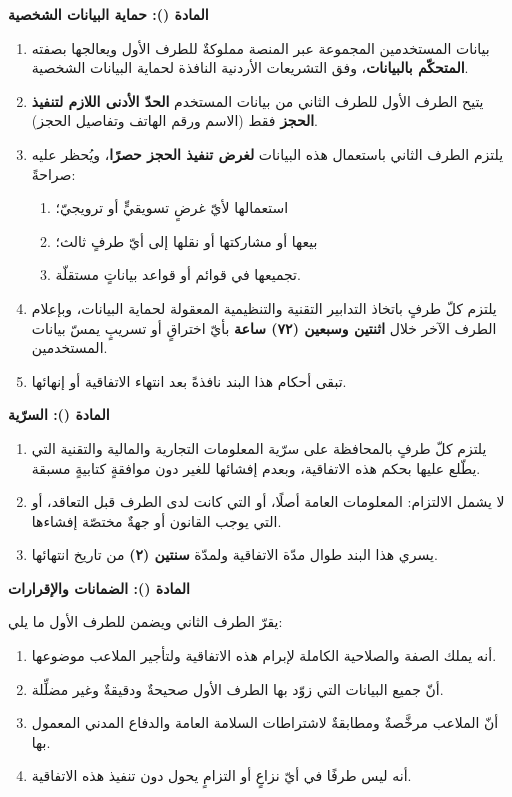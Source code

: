 \documentclass[12pt,a4paper]{article}
\newcounter{bndc}
\newcommand{\bnd}[1]{%
  \vspace{10pt}\par\noindent
  {\color{teal}\bfseries\large المادة (\arabic{bndc}): #1}%
  \stepcounter{bndc}%
  \par\vspace{2pt}\noindent{\color{rule}\rule{\linewidth}{0.6pt}}\par\vspace{4pt}%
}
\newcommand{\mlh}[1]{{\bfseries #1}}
\newenvironment{bnditems}
  {\begin{enumerate}[label=\arabic{bndc}.\arabic*,leftmargin=1.6em,itemsep=3pt,topsep=3pt]}
  {\end{enumerate}}
\newenvironment{sublist}
  {\begin{enumerate}[label=(\alph*),leftmargin=1.6em,itemsep=2pt,topsep=2pt]}
  {\end{enumerate}}
\begin{document}
\bnd{حماية البيانات الشخصية}\label{art:data}
\begin{bnditems}
  \item بيانات المستخدمين المجموعة عبر المنصة مملوكةٌ للطرف الأول ويعالجها بصفته \mlh{المتحكّم بالبيانات}، وفق التشريعات الأردنية النافذة لحماية البيانات الشخصية.
  \item يتيح الطرف الأول للطرف الثاني من بيانات المستخدم \mlh{الحدّ الأدنى اللازم لتنفيذ الحجز} فقط (الاسم ورقم الهاتف وتفاصيل الحجز).
  \item يلتزم الطرف الثاني باستعمال هذه البيانات \mlh{لغرض تنفيذ الحجز حصرًا}، ويُحظر عليه صراحةً:
  \begin{sublist}
    \item استعمالها لأيّ غرضٍ تسويقيٍّ أو ترويجيّ؛
    \item بيعها أو مشاركتها أو نقلها إلى أيّ طرفٍ ثالث؛
    \item تجميعها في قوائم أو قواعد بياناتٍ مستقلّة.
  \end{sublist}
  \item يلتزم كلّ طرفٍ باتخاذ التدابير التقنية والتنظيمية المعقولة لحماية البيانات، وبإعلام الطرف الآخر خلال \mlh{اثنتين وسبعين (٧٢) ساعة} بأيّ اختراقٍ أو تسريبٍ يمسّ بيانات المستخدمين.
  \item تبقى أحكام هذا البند نافذةً بعد انتهاء الاتفاقية أو إنهائها.
\end{bnditems}

\bnd{السرّية}\label{art:conf}
\begin{bnditems}
  \item يلتزم كلّ طرفٍ بالمحافظة على سرّية المعلومات التجارية والمالية والتقنية التي يطّلع عليها بحكم هذه الاتفاقية، وبعدم إفشائها للغير دون موافقةٍ كتابيةٍ مسبقة.
  \item لا يشمل الالتزام: المعلومات العامة أصلًا، أو التي كانت لدى الطرف قبل التعاقد، أو التي يوجب القانون أو جهةٌ مختصّة إفشاءها.
  \item يسري هذا البند طوال مدّة الاتفاقية ولمدّة \mlh{سنتين (٢)} من تاريخ انتهائها.
\end{bnditems}

\bnd{الضمانات والإقرارات}
يقرّ الطرف الثاني ويضمن للطرف الأول ما يلي:
\begin{bnditems}
  \item أنه يملك الصفة والصلاحية الكاملة لإبرام هذه الاتفاقية ولتأجير الملاعب موضوعها.
  \item أنّ جميع البيانات التي زوّد بها الطرف الأول صحيحةٌ ودقيقةٌ وغير مضلِّلة.
  \item أنّ الملاعب مرخَّصةٌ ومطابقةٌ لاشتراطات السلامة العامة والدفاع المدني المعمول بها.
  \item أنه ليس طرفًا في أيّ نزاعٍ أو التزامٍ يحول دون تنفيذ هذه الاتفاقية.
\end{bnditems}
\end{document}

